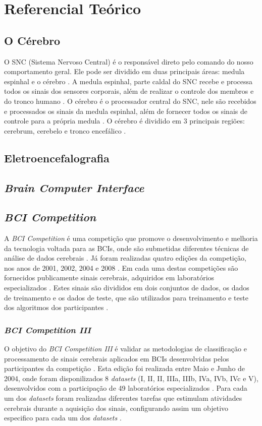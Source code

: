 
\chapter[Referencial Teórico]{Referencial Teórico}

\section{O Cérebro}
O SNC (Sistema Nervoso Central) é o responsável direto pelo comando do nosso comportamento geral\cite{David_Clarck}. Ele pode ser dividido em duas principais áreas: medula espinhal e o cérebro \cite{KANDEL}.
A medula espinhal, parte caldal do SNC recebe e processa todos os sinais dos sensores corporais, além de realizar o controle dos membros e do tronco humano \cite{KANDEL}.
O cérebro é o processador central do SNC, nele são recebidos e processados os sinais da medula espinhal, além de fornecer todos os sinais de controle para a própria medula \cite{KANDEL}. O cérebro é dividido em 3 principais regiões: cerebrum, cerebelo e tronco encefálico \cite{SIULYDissertacao}.
\section{Eletroencefalografia}

\section{\textit{Brain Computer Interface}}

\section{\textit{BCI Competition}}
A \textit{BCI Competition} é uma competição que promove o desenvolvimento e melhoria da tecnologia voltada para as BCIs, onde são submetidas diferentes técnicas de análise de dados cerebrais \cite{BCICompetition}. Já foram realizadas quatro edições da competição, nos anos de 2001, 2002, 2004 e 2008 \cite{BCICompetition}. Em cada uma destas competições são fornecidos publicamente sinais cerebrais, adquiridos em laboratórios especializados \cite{BCICompetition}. Estes sinais são divididos em dois conjuntos de dados, os dados de treinamento e os dados de teste, que são utilizados para treinamento e teste dos algoritmos dos participantes \cite{BCICompetition}.

\subsection{\textit{BCI Competition III}}
O objetivo do \textit{BCI Competition III} é validar as metodologias de classificação e processamento de sinais cerebrais aplicados em BCIs desenvolvidas pelos participantes da competição \cite{siteBCI}. Esta edição foi realizada entre Maio e Junho de 2004, onde foram disponilizados 8 \textit{datasets} (I, II, II, IIIa, IIIb, IVa, IVb, IVc e V), desenvolvidos com a participação de 49 laboratórios especializados \cite{BCICompetition}.
Para cada um dos \textit{datasets} foram realizadas diferentes tarefas que estimulam atividades cerebrais durante a aquisição dos sinais, configurando assim um objetivo especifico para cada um dos \textit{datasets} \cite{siteBCI}.

